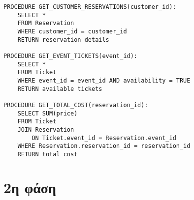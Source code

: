\documentclass{article}
\begin{document}
\begin{lstlisting}
PROCEDURE GET_CUSTOMER_RESERVATIONS(customer_id):
    SELECT * 
    FROM Reservation 
    WHERE customer_id = customer_id
    RETURN reservation details

PROCEDURE GET_EVENT_TICKETS(event_id):
    SELECT * 
    FROM Ticket 
    WHERE event_id = event_id AND availability = TRUE
    RETURN available tickets

PROCEDURE GET_TOTAL_COST(reservation_id):
    SELECT SUM(price) 
    FROM Ticket 
    JOIN Reservation 
        ON Ticket.event_id = Reservation.event_id
    WHERE Reservation.reservation_id = reservation_id
    RETURN total cost

\end{lstlisting}
\section*{2η φάση}
\end{document}
